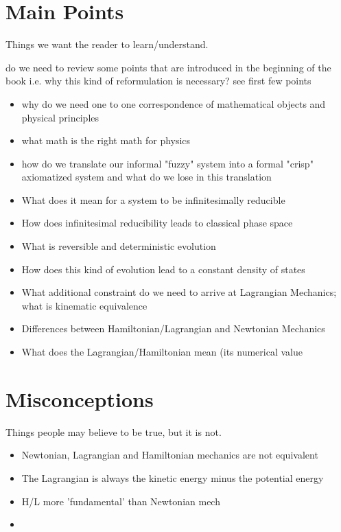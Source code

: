 \documentclass{article}
\begin{document}
\section{Main Points}
Things we want the reader to learn/understand.

do we need to review some points that are introduced in the beginning of the book i.e. why this kind of reformulation is necessary? see first few points
\begin{itemize}

\item why do we need one to one correspondence of mathematical objects and physical principles
\item what math is the right math for physics
\item how do we translate our informal "fuzzy" system into a formal "crisp" axiomatized system and what do we lose in this translation

	\item What does it mean for a system to be infinitesimally reducible
	\item How does infinitesimal reducibility leads to classical phase space
	\item What is reversible and deterministic evolution
	\item How does this kind of evolution lead to a constant density of states
	\item What additional constraint do we need to arrive at Lagrangian Mechanics; what is kinematic equivalence
	\item Differences between Hamiltonian/Lagrangian and Newtonian Mechanics
	

	
	\item What does the Lagrangian/Hamiltonian mean (its numerical value
\end{itemize}


\section{Misconceptions}
Things people may believe to be true, but it is not.

\begin{itemize}
	\item Newtonian, Lagrangian and Hamiltonian mechanics are not equivalent
	\item The Lagrangian is always the kinetic energy minus the potential energy 
	\item H/L more 'fundamental' than Newtonian mech
\item 
\end{itemize}
\end{document}

